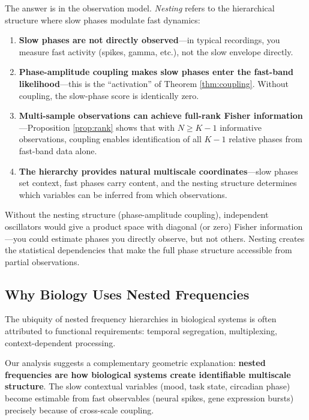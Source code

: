 \documentclass[12pt]{article}
\begin{document}
The answer is in the observation model. \emph{Nesting} refers to the hierarchical structure where slow phases modulate fast dynamics:
\begin{enumerate}
    \item \textbf{Slow phases are not directly observed}---in typical recordings, you measure fast activity (spikes, gamma, etc.), not the slow envelope directly.

    \item \textbf{Phase-amplitude coupling makes slow phases enter the fast-band likelihood}---this is the ``activation'' of Theorem \ref{thm:coupling}. Without coupling, the slow-phase score is identically zero.

    \item \textbf{Multi-sample observations can achieve full-rank Fisher information}---Proposition \ref{prop:rank} shows that with $N \geq K-1$ informative observations, coupling enables identification of all $K-1$ relative phases from fast-band data alone.

    \item \textbf{The hierarchy provides natural multiscale coordinates}---slow phases set context, fast phases carry content, and the nesting structure determines which variables can be inferred from which observations.
\end{enumerate}

Without the nesting structure (phase-amplitude coupling), independent oscillators would give a product space with diagonal (or zero) Fisher information---you could estimate phases you directly observe, but not others. Nesting creates the statistical dependencies that make the full phase structure accessible from partial observations.

\subsection{Why Biology Uses Nested Frequencies}

The ubiquity of nested frequency hierarchies in biological systems \citep{buzsaki2006rhythms,lisman2013theta} is often attributed to functional requirements: temporal segregation, multiplexing, context-dependent processing.

Our analysis suggests a complementary geometric explanation: \textbf{nested frequencies are how biological systems create identifiable multiscale structure}. The slow contextual variables (mood, task state, circadian phase) become estimable from fast observables (neural spikes, gene expression bursts) precisely because of cross-scale coupling.
\end{document}
